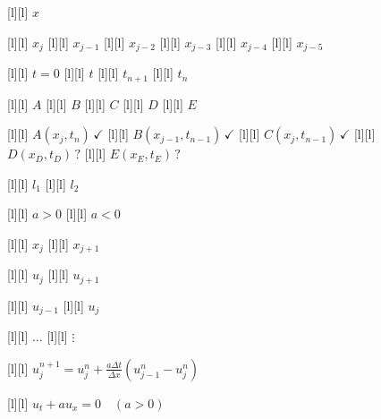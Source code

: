 \begin{figure}[ht]
	\centering
	\footnotesize

	[l] {$x$}

	[l] {$x_{j}$}
	[l] {$x_{j-1}$}
	[l] {$x_{j-2}$}
	[l] {$x_{j-3}$}
	[l] {$x_{j-4}$}
	[l] {$x_{j-5}$}


	[l] {$t=0$}
	[l] {$t$}
	[l] {$t_{n+1}$}
	[l] {$t_{n}$}

	[l] {$A$}
	[l] {$B$}
	[l] {$C$}
	[l] {$D$}
	[l] {$E$}

	[l] {$A(x_j,t_n)\,\checkmark$}
	[l] {$B(x_{j-1},t_{n-1})\,\checkmark$}
	[l] {$C(x_{j},t_{n-1})\,\checkmark$}
	[l] {$D(x_D,t_D)\,?$}
	[l] {$E(x_E,t_E)\, ?$}

	[l] {$l_1$}
	[l] {$l_2$}

	[l] {$a>0$}
	[l] {$a<0$}

	[l] {$x_{j}$}
	[l] {$x_{j+1}$}

	[l] {$u_{j}$}
	[l] {$u_{j+1}$}

	[l] {$u_{j-1}$}
	[l] {$u_{j}$}

	[l] {$\dots$}
	[l] {$\vdots$}

	[l] {$\displaystyle u_{j}^{n+1} = u_{j}^{n} + \frac{a\Delta t}{\Delta x}\left(u_{j-1}^{n}-u_{j}^{n}\right)$}

	[l] {$\displaystyle u_{t} + au_{x} = 0 \quad (a>0)$}





\end{figure}

